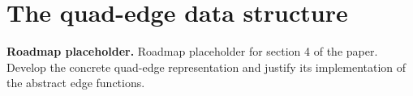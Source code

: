 \chapter{The quad-edge data structure}

\noindent\textbf{Roadmap placeholder.}
Roadmap placeholder for section 4 of the paper. Develop the concrete quad-edge
representation and justify its implementation of the abstract edge functions.
